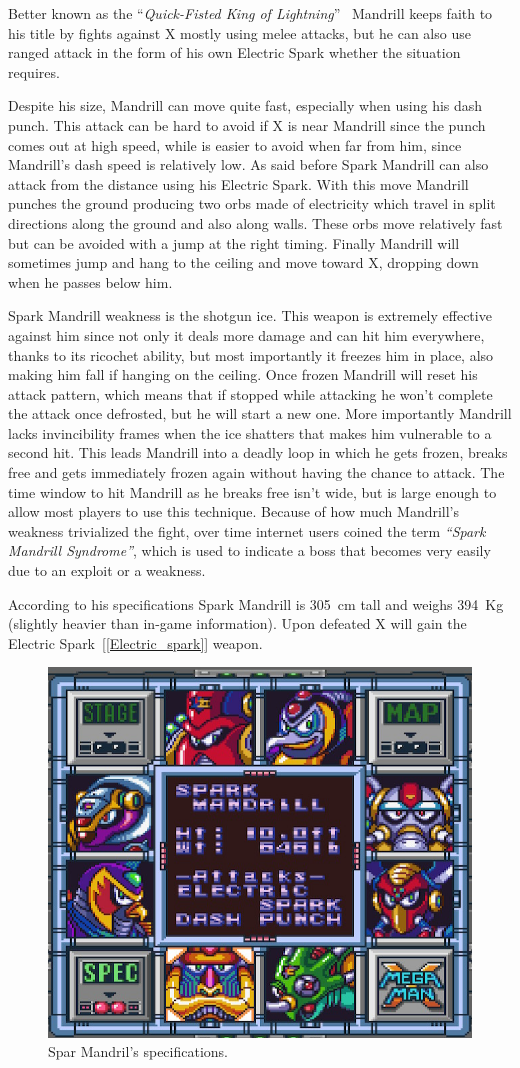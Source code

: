 Better known as the ``\textit{Quick-Fisted King of Lightning}''~\cite{book:MMX_Complete_art} Mandrill keeps faith to his title by fights against X mostly using melee attacks, but he can also use ranged attack in the form of his own Electric Spark whether the situation requires.

Despite his size, Mandrill can move quite fast, especially when using his dash punch. This attack can be hard to avoid if X is near Mandrill since the punch comes out at high speed, while is easier to avoid when far from him, since Mandrill's dash speed is relatively low.  As said before Spark Mandrill can also attack from the distance using his Electric Spark. With this move Mandrill punches the ground producing two orbs made of electricity which travel in split directions along the ground and also along walls. These orbs move relatively fast but can be avoided with a jump at the right timing. Finally Mandrill will sometimes jump and hang to the ceiling and move toward X, dropping down when he passes below him. 

Spark Mandrill weakness is the shotgun ice. This weapon is extremely effective against him since not only it deals more damage and can hit him everywhere, thanks to its ricochet ability, but most importantly it freezes him in place, also making him fall if hanging on the ceiling. Once frozen Mandrill will reset his attack pattern, which means that if stopped while attacking he won't complete the attack once defrosted, but he will start a new one. More importantly Mandrill lacks invincibility frames when the ice shatters that makes him vulnerable to a second hit. This leads Mandrill into a deadly loop in which he gets frozen, breaks free and gets immediately frozen again without having the chance to attack. The time window to hit Mandrill as he breaks free isn't wide, but is large enough to allow most players to use this technique. Because of how much Mandrill's weakness trivialized the fight, over time internet users coined the term \textit{``Spark Mandrill Syndrome''}, which is used to indicate a boss that becomes very easily due to an exploit or a weakness.

According to his specifications Spark Mandrill is 305~cm tall and weighs 394~Kg (slightly heavier than in-game information). Upon defeated X will gain the Electric Spark~[\ref{Electric_spark}] weapon.


\begin{figure}[htp]
	\centering
	\includegraphics[width=0.4\linewidth]{figures/X1/Spark_mandrill/Spark_mandril_specs.png}
	\caption{Spar Mandril's specifications.}
\end{figure}

